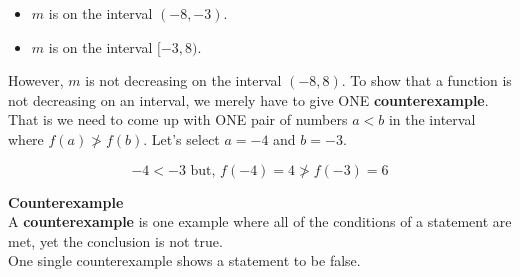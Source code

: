 \documentclass{ximera}
\begin{document}
\begin{example}
\begin{itemize}
\item $m$ is  on the interval $(-8,-3)$.  
\item $m$ is  on the interval $[-3, 8)$. 
\end{itemize}



However, $m$ is not decreasing on the interval $(-8, 8)$.  To show that a function is not decreasing on an interval, we merely have to give ONE \textbf{counterexample}. That is we need to come up with ONE pair of numbers $a < b$ in the interval where $f(a) \ngtr f(b)$.  Let's select $a = -4$ and $b = -3$.

\[ -4 < -3    \text{ but, }   f(-4) = 4  \ngtr f(-3) = 6 \]




\end{example}












\begin{idea} \textbf{\textcolor{green!50!black}{Counterexample}} \\

A \textbf{counterexample} is one example where all of the conditions of a statement are met, yet the conclusion is not true.  \\

One single counterexample shows a statement to be false.


\end{idea}
\end{document}
